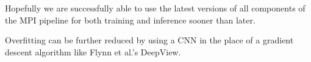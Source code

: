 







Hopefully we are successfully able to use the latest versions of all components of the MPI pipeline for both training and inference sooner than later.  







Overfitting can be further reduced by using a CNN in the place of a gradient descent algorithm like Flynn et al.'s DeepView.


